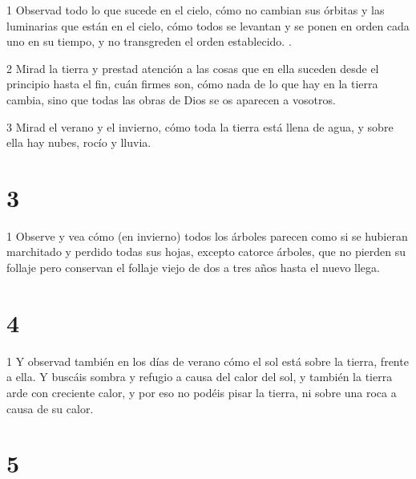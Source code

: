 \par 1 Observad todo lo que sucede en el cielo, cómo no cambian sus órbitas y las luminarias que están en el cielo, cómo todos se levantan y se ponen en orden cada uno en su tiempo, y no transgreden el orden establecido. .
\par 2 Mirad la tierra y prestad atención a las cosas que en ella suceden desde el principio hasta el fin, cuán firmes son, cómo nada de lo que hay en la tierra cambia, sino que todas las obras de Dios se os aparecen a vosotros.
\par 3 Mirad el verano y el invierno, cómo toda la tierra está llena de agua, y sobre ella hay nubes, rocío y lluvia.

\chapter{3}

\par 1 Observe y vea cómo (en invierno) todos los árboles parecen como si se hubieran marchitado y perdido todas sus hojas, excepto catorce árboles, que no pierden su follaje pero conservan el follaje viejo de dos a tres años hasta el nuevo llega.

\chapter{4}

\par 1 Y observad también en los días de verano cómo el sol está sobre la tierra, frente a ella. Y buscáis sombra y refugio a causa del calor del sol, y también la tierra arde con creciente calor, y por eso no podéis pisar la tierra, ni sobre una roca a causa de su calor.

\chapter{5}

